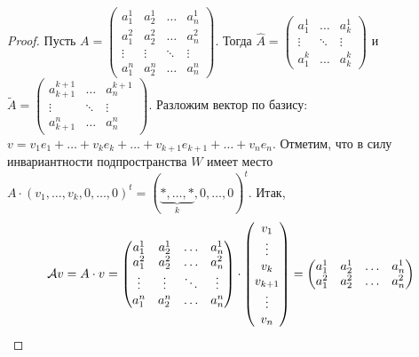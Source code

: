 \begin{proof}
    Пусть 
    $
    A =
    \begin{pmatrix}
        a^1_1 & a^1_2 & \ldots & a^1_n\\
        a^2_1 & a^2_2 & \ldots & a^2_n\\
        \vdots & \vdots & \ddots & \vdots\\
        a^n_1 & a^n_2 & \ldots & a^n_n
    \end{pmatrix}
    $. Тогда
    $
    \widehat{A} =
    \begin{pmatrix}
        a^1_1 & \ldots & a^1_k\\
        \vdots & \ddots & \vdots\\
        a^k_1 & \ldots & a^k_k
    \end{pmatrix}
    $ и
    $
    \widetilde{A} =
    \begin{pmatrix}
        a^{k + 1}_{k + 1} & \ldots & a^{k + 1}_n\\
        \vdots & \ddots & \vdots\\
        a^n_{k + 1} & \ldots & a^n_n
    \end{pmatrix}
    $. Разложим вектор по базису: $v = v_1e_1 + \ldots + v_ke_k + \ldots + v_{k + 1}e_{k + 1} + \ldots + v_ne_n$. Отметим, что в силу инвариантности подпространства $W$ имеет место
    $
    A \cdot (v_1, \ldots, v_k, 0, \ldots, 0)^t = (\underbrace{\ast, \ldots, \ast}_{k}, 0, \ldots, 0)^t
    $. Итак,
    \begin{multline*}
        \mathcal{A} v = A \cdot v =
        \begin{pmatrix}
            a^1_1 & a^1_2 & \ldots & a^1_n\\
            a^2_1 & a^2_2 & \ldots & a^2_n\\
            \vdots & \vdots & \ddots & \vdots\\
            a^n_1 & a^n_2 & \ldots & a^n_n
        \end{pmatrix} \cdot
        \begin{pmatrix}
            v_1\\
            \vdots\\
            v_k\\
            v_{k + 1}\\
            \vdots\\
            v_n
        \end{pmatrix} = 
        \begin{pmatrix}
            a^1_1 & a^1_2 & \ldots & a^1_n\\
            a^2_1 & a^2_2 & \ldots & a^2_n\\

\end{pmatrix}
\end{multline*}
\end{proof}
